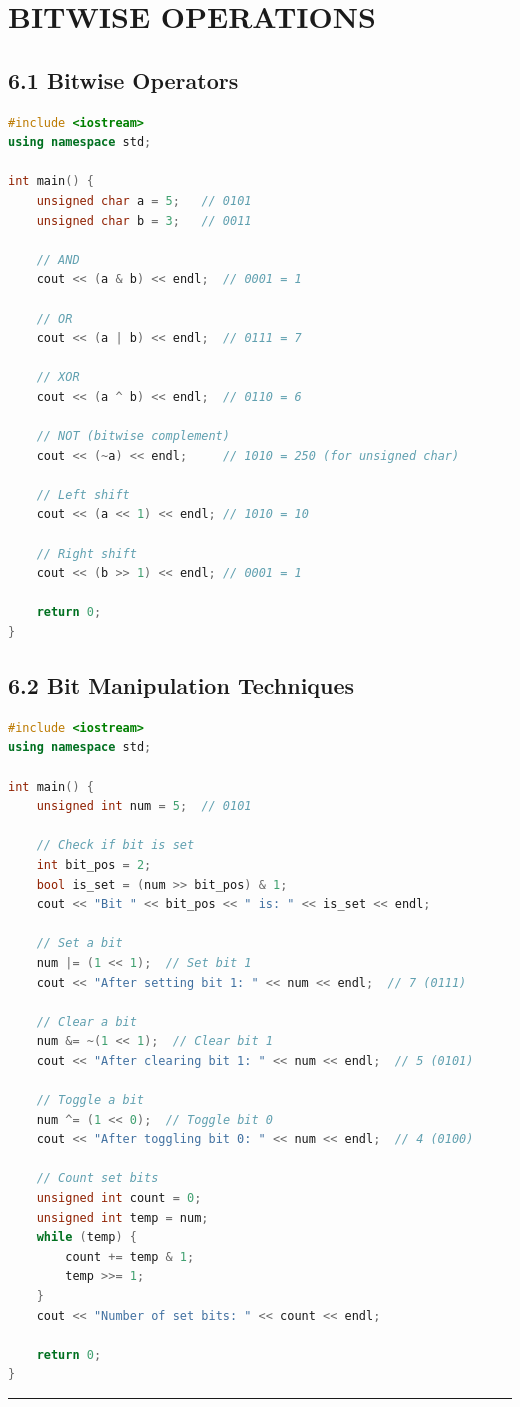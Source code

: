 \hypertarget{bitwise-operations}{%
\chapter{BITWISE OPERATIONS}\label{bitwise-operations}}

\hypertarget{bitwise-operators}{%
\section{6.1 Bitwise Operators}\label{bitwise-operators}}

\begin{lstlisting}[language={C++}]
#include <iostream>
using namespace std;

int main() {
    unsigned char a = 5;   // 0101
    unsigned char b = 3;   // 0011
    
    // AND
    cout << (a & b) << endl;  // 0001 = 1
    
    // OR
    cout << (a | b) << endl;  // 0111 = 7
    
    // XOR
    cout << (a ^ b) << endl;  // 0110 = 6
    
    // NOT (bitwise complement)
    cout << (~a) << endl;     // 1010 = 250 (for unsigned char)
    
    // Left shift
    cout << (a << 1) << endl; // 1010 = 10
    
    // Right shift
    cout << (b >> 1) << endl; // 0001 = 1
    
    return 0;
}
\end{lstlisting}

\hypertarget{bit-manipulation-techniques}{%
\section{6.2 Bit Manipulation
Techniques}\label{bit-manipulation-techniques}}

\begin{lstlisting}[language={C++}]
#include <iostream>
using namespace std;

int main() {
    unsigned int num = 5;  // 0101
    
    // Check if bit is set
    int bit_pos = 2;
    bool is_set = (num >> bit_pos) & 1;
    cout << "Bit " << bit_pos << " is: " << is_set << endl;
    
    // Set a bit
    num |= (1 << 1);  // Set bit 1
    cout << "After setting bit 1: " << num << endl;  // 7 (0111)
    
    // Clear a bit
    num &= ~(1 << 1);  // Clear bit 1
    cout << "After clearing bit 1: " << num << endl;  // 5 (0101)
    
    // Toggle a bit
    num ^= (1 << 0);  // Toggle bit 0
    cout << "After toggling bit 0: " << num << endl;  // 4 (0100)
    
    // Count set bits
    unsigned int count = 0;
    unsigned int temp = num;
    while (temp) {
        count += temp & 1;
        temp >>= 1;
    }
    cout << "Number of set bits: " << count << endl;
    
    return 0;
}
\end{lstlisting}

\begin{center}\rule{0.5\linewidth}{0.5pt}\end{center}
